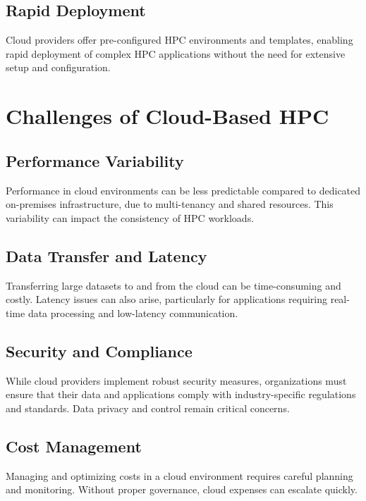 \subsection{Rapid Deployment}

Cloud providers offer pre-configured HPC environments and templates, enabling rapid deployment of complex HPC applications without the need for extensive setup and configuration.

\section{Challenges of Cloud-Based HPC}

\subsection{Performance Variability}

Performance in cloud environments can be less predictable compared to dedicated on-premises infrastructure, due to multi-tenancy and shared resources. This variability can impact the consistency of HPC workloads.

\subsection{Data Transfer and Latency}

Transferring large datasets to and from the cloud can be time-consuming and costly. Latency issues can also arise, particularly for applications requiring real-time data processing and low-latency communication.

\subsection{Security and Compliance}

While cloud providers implement robust security measures, organizations must ensure that their data and applications comply with industry-specific regulations and standards. Data privacy and control remain critical concerns.

\subsection{Cost Management}

Managing and optimizing costs in a cloud environment requires careful planning and monitoring. Without proper governance, cloud expenses can escalate quickly.

